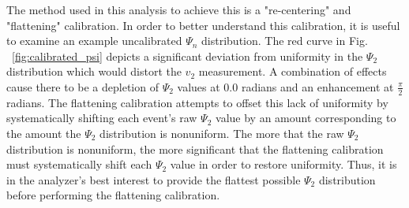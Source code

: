 The method used in this analysis to achieve this is a "re-centering" and "flattening" calibration. In order to better understand this calibration, it is useful to examine an example uncalibrated $\Psi_n$ distribution.
The red curve in Fig. ~\ref{fig:calibrated_psi} depicts a significant deviation from uniformity in the $\Psi_2$ distribution which would distort the $v_2$ measurement. 
A combination of effects cause there to be a depletion of $\Psi_2$ values at 0.0 radians and an enhancement at $\frac{\pi}{2}$ radians. The flattening calibration attempts to offset this 
lack of uniformity by systematically shifting each event's raw $\Psi_2$ value by an amount corresponding to the amount the $\Psi_2$ distribution is nonuniform. The more that the raw $\Psi_2$
distribution is nonuniform, the more significant that the flattening calibration must systematically shift each $\Psi_2$ value in order to restore uniformity. Thus, it is in the analyzer's best interest
to provide the flattest possible $\Psi_2$ distribution before performing the flattening calibration.
